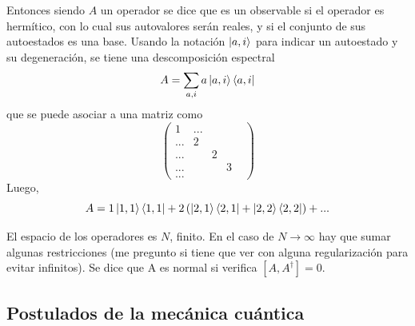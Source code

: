 \documentclass[10pt,oneside]{CBFT_book}
\begin{document}
Entonces siendo $A$ un operador se dice que es un observable si el operador es hermítico, con lo cual
sus autovalores serán reales, y si el conjunto de sus autoestados es una base.
Usando la notación $\Ket{a,i}$ para indicar un autoestado y su degeneración, se tiene una 
descomposición espectral
\[
	A = \sum_{a,i} a \Ket{a,i}\Bra{a,i}
\]
que se puede asociar a una matriz como
\[
	\begin{pmatrix}
	1 & ... &  & & \\
	... & 2 & & & \\
	... & & 2 & & \\
	... & & & 3 &  \\
	... & & & & 
	\end{pmatrix}
\]
Luego,
\[
	A = 1 \Ket{1,1}\Bra{1,1} + 2 \left( \Ket{2,1}\Bra{2,1} + \Ket{2,2}\Bra{2,2}\right) + ...
\]

El espacio de los operadores es $N$, finito. En el caso de $N \to \infty$ hay que sumar algunas
restricciones (me pregunto si tiene que ver con alguna regularización para evitar infinitos).
Se dice que A es normal si verifica $[A,A^\dagger] = 0$.

\subsection{Postulados de la mecánica cuántica}
\end{document}
